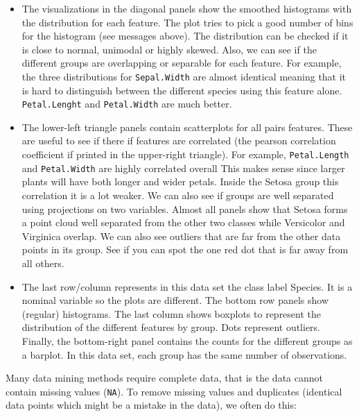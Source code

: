 \documentclass[
  notitlepage]{book}
\begin{document}
\begin{itemize}
\item
  The visualizations in the diagonal panels show the
  smoothed histograms with the distribution for each feature.
  The plot tries to pick a good number of bins for the histogram
  (see messages above). The distribution can be checked if it is close to normal,
  unimodal or highly skewed. Also, we can see if the different groups are overlapping
  or separable for each feature. For example, the three distributions for \texttt{Sepal.Width}
  are almost identical meaning that it is hard to distinguish between
  the different species using this feature alone. \texttt{Petal.Lenght} and \texttt{Petal.Width}
  are much better.
\item
  The lower-left triangle panels contain scatterplots for all pairs features. These
  are useful to see if there if features are correlated (the pearson correlation
  coefficient if printed in the upper-right triangle). For example,
  \texttt{Petal.Length} and \texttt{Petal.Width} are highly correlated overall
  This makes sense since larger plants will have both longer and wider petals.
  Inside the Setosa group this correlation it is a lot weaker.
  We can also see if groups are
  well separated using projections on two variables. Almost all panels show that
  Setosa forms a point cloud well separated from the other two classes while
  Versicolor and Virginica overlap.
  We can also see outliers that are far from the other data points in its group.
  See if you can spot the one red dot that is far away from all others.
\item
  The last row/column represents in this data set the class label Species.
  It is a nominal variable so the plots are different. The bottom row panels
  show (regular) histograms. The last column shows boxplots to represent
  the distribution of the different features by group. Dots represent
  outliers. Finally, the bottom-right panel contains the counts for the different
  groups as a barplot. In this data set, each group has the same number of observations.
\end{itemize}

Many data mining methods require complete data, that is the data cannot
contain missing values (\texttt{NA}). To remove missing values and duplicates
(identical data points which might be a mistake in the data), we often
do this:
\end{document}
